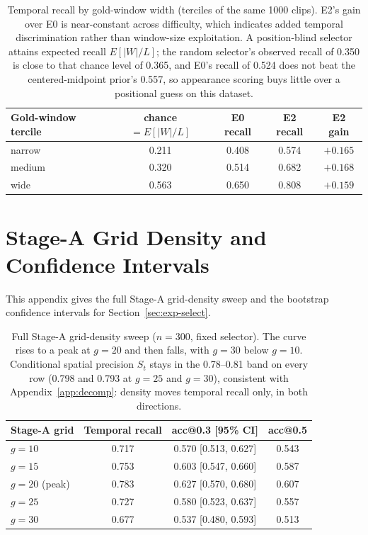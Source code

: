 \documentclass[10pt]{article}
\begin{document}
\begin{table}[htbp]
\centering
\small
\begin{tabular}{lcccc}
\toprule
Gold-window tercile & chance $=E[|W|/L]$ & E0 recall & E2 recall & E2 gain \\
\midrule
narrow & 0.211 & 0.408 & 0.574 & $+0.165$ \\
medium & 0.320 & 0.514 & 0.682 & $+0.168$ \\
wide & 0.563 & 0.650 & 0.808 & $+0.159$ \\
\bottomrule
\end{tabular}
\caption{Temporal recall by gold-window width (terciles of the same 1000 clips). E2's gain over E0 is near-constant across difficulty, which indicates added temporal discrimination rather than window-size exploitation. A position-blind selector attains expected recall $E[|W|/L]$; the random selector's observed recall of 0.350 is close to that chance level of 0.365, and E0's recall of 0.524 does not beat the centered-midpoint prior's 0.557, so appearance scoring buys little over a positional guess on this dataset.}
\label{tab:tercile}
\end{table}

\section{Stage-A Grid Density and Confidence Intervals}\label{app:grid}

This appendix gives the full Stage-A grid-density sweep and the bootstrap confidence intervals for Section~\ref{sec:exp-select}.

\begin{table}[htbp]
\centering
\small
\begin{tabular}{lccc}
\toprule
Stage-A grid & Temporal recall & acc@0.3 [95\% CI] & acc@0.5 \\
\midrule
$g=10$ & 0.717 & 0.570 [0.513, 0.627] & 0.543 \\
$g=15$ & 0.753 & 0.603 [0.547, 0.660] & 0.587 \\
$g=20$ (peak) & 0.783 & 0.627 [0.570, 0.680] & 0.607 \\
$g=25$ & 0.727 & 0.580 [0.523, 0.637] & 0.557 \\
$g=30$ & 0.677 & 0.537 [0.480, 0.593] & 0.513 \\
\bottomrule
\end{tabular}
\caption{Full Stage-A grid-density sweep ($n=300$, fixed selector). The curve rises to a peak at $g=20$ and then falls, with $g=30$ below $g=10$. Conditional spatial precision $S_t$ stays in the 0.78--0.81 band on every row (0.798 and 0.793 at $g=25$ and $g=30$), consistent with Appendix~\ref{app:decomp}: density moves temporal recall only, in both directions.}
\label{tab:gridsweep}
\end{table}
\end{document}
